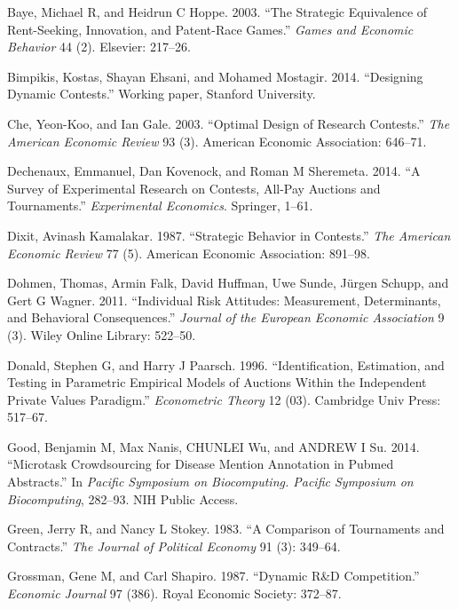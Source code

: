 \documentclass[11pt, titlepage]{article}
\begin{document}
\hypertarget{ref-baye2003strategic}{}
Baye, Michael R, and Heidrun C Hoppe. 2003. ``The Strategic Equivalence
of Rent-Seeking, Innovation, and Patent-Race Games.'' \emph{Games and
Economic Behavior} 44 (2). Elsevier: 217--26.

\hypertarget{ref-bimpikis2014designing}{}
Bimpikis, Kostas, Shayan Ehsani, and Mohamed Mostagir. 2014. ``Designing
Dynamic Contests.'' Working paper, Stanford University.

\hypertarget{ref-che2003optimal}{}
Che, Yeon-Koo, and Ian Gale. 2003. ``Optimal Design of Research
Contests.'' \emph{The American Economic Review} 93 (3). American
Economic Association: 646--71.

\hypertarget{ref-dechenaux2014survey}{}
Dechenaux, Emmanuel, Dan Kovenock, and Roman M Sheremeta. 2014. ``A
Survey of Experimental Research on Contests, All-Pay Auctions and
Tournaments.'' \emph{Experimental Economics}. Springer, 1--61.

\hypertarget{ref-dixit1987strategic}{}
Dixit, Avinash Kamalakar. 1987. ``Strategic Behavior in Contests.''
\emph{The American Economic Review} 77 (5). American Economic
Association: 891--98.

\hypertarget{ref-dohmen2011individual}{}
Dohmen, Thomas, Armin Falk, David Huffman, Uwe Sunde, Jürgen Schupp, and
Gert G Wagner. 2011. ``Individual Risk Attitudes: Measurement,
Determinants, and Behavioral Consequences.'' \emph{Journal of the
European Economic Association} 9 (3). Wiley Online Library: 522--50.

\hypertarget{ref-donald1996identification}{}
Donald, Stephen G, and Harry J Paarsch. 1996. ``Identification,
Estimation, and Testing in Parametric Empirical Models of Auctions
Within the Independent Private Values Paradigm.'' \emph{Econometric
Theory} 12 (03). Cambridge Univ Press: 517--67.

\hypertarget{ref-good2014microtask}{}
Good, Benjamin M, Max Nanis, CHUNLEI Wu, and ANDREW I Su. 2014.
``Microtask Crowdsourcing for Disease Mention Annotation in Pubmed
Abstracts.'' In \emph{Pacific Symposium on Biocomputing. Pacific
Symposium on Biocomputing}, 282--93. NIH Public Access.

\hypertarget{ref-green1983comparison}{}
Green, Jerry R, and Nancy L Stokey. 1983. ``A Comparison of Tournaments
and Contracts.'' \emph{The Journal of Political Economy} 91 (3):
349--64.

\hypertarget{ref-grossman1987dynamic}{}
Grossman, Gene M, and Carl Shapiro. 1987. ``Dynamic R\&D Competition.''
\emph{Economic Journal} 97 (386). Royal Economic Society: 372--87.
\end{document}
